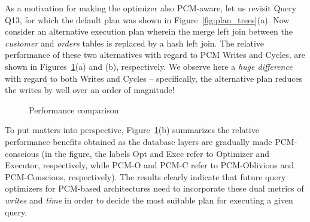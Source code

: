 As a motivation for making the optimizer also PCM-aware, let
us revisit Query Q13, for which the default plan was shown in
Figure~\ref{fig:plan_trees}(a).  Now consider an alternative execution
plan wherein the merge left join between the \textit{customer} and
\textit{orders} tables is replaced by a hash left join.  The relative
performance of these two alternatives with regard to PCM Writes
and Cycles, are shown in Figures~\ref{fig:perf_comp}(a) and (b),
respectively. We observe here a \emph{huge difference} with regard to
both Writes and Cycles -- specifically, the alternative plan reduces
the writes by well over an order of magnitude!


\begin{figure}[htbp]
\centering
	

\caption{Performance comparison}
\label{fig:perf_comp}
\end{figure}

To put matters into perspective, Figure~\ref{fig:perf_comp}(b) summarizes
the relative performance benefits obtained as the database layers are
gradually made PCM-conscious (in the figure, the labels Opt and Exec refer to Optimizer and Executor, respectively, while PCM-O and PCM-C
refer to PCM-Oblivious and PCM-Conscious, respectively). The results
clearly indicate that future query optimizers for PCM-based architectures
need to incorporate these dual metrics of \emph{writes} and \emph{time}
in order to decide the most suitable plan for executing a given query.
